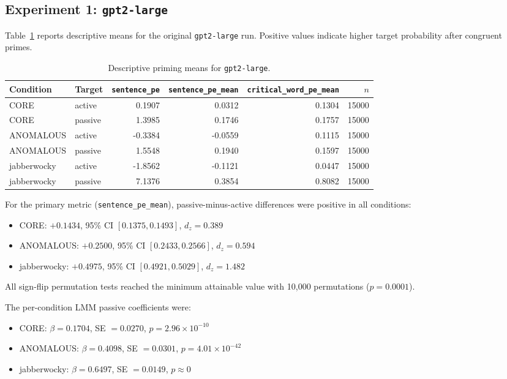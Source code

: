 \documentclass[11pt]{article}
\begin{document}
\subsection*{Experiment 1: \texttt{gpt2-large}}

Table~\ref{tab:gpt2desc} reports descriptive means for the original
\texttt{gpt2-large} run. Positive values indicate higher target probability
after congruent primes.

\begin{table}[h]
\centering
\caption{Descriptive priming means for \texttt{gpt2-large}.}
\label{tab:gpt2desc}
\begin{tabular}{llrrrr}
\toprule
Condition & Target & \texttt{sentence\_pe} & \texttt{sentence\_pe\_mean} & \texttt{critical\_word\_pe\_mean} & \(n\) \\
\midrule
CORE & active & 0.1907 & 0.0312 & 0.1304 & 15000 \\
CORE & passive & 1.3985 & 0.1746 & 0.1757 & 15000 \\
ANOMALOUS & active & -0.3384 & -0.0559 & 0.1115 & 15000 \\
ANOMALOUS & passive & 1.5548 & 0.1940 & 0.1597 & 15000 \\
jabberwocky & active & -1.8562 & -0.1121 & 0.0447 & 15000 \\
jabberwocky & passive & 7.1376 & 0.3854 & 0.8082 & 15000 \\
\bottomrule
\end{tabular}
\end{table}

For the primary metric (\texttt{sentence\_pe\_mean}), passive-minus-active
differences were positive in all conditions:

\begin{itemize}[leftmargin=*]
    \item CORE: \(+0.1434\), 95\% CI \([0.1375, 0.1493]\), \(d_z=0.389\)
    \item ANOMALOUS: \(+0.2500\), 95\% CI \([0.2433, 0.2566]\), \(d_z=0.594\)
    \item jabberwocky: \(+0.4975\), 95\% CI \([0.4921, 0.5029]\), \(d_z=1.482\)
\end{itemize}

All sign-flip permutation tests reached the minimum attainable value with
10,000 permutations (\(p=0.0001\)).

The per-condition LMM passive coefficients were:

\begin{itemize}[leftmargin=*]
    \item CORE: \(\beta=0.1704\), SE \(=0.0270\), \(p=2.96\times10^{-10}\)
    \item ANOMALOUS: \(\beta=0.4098\), SE \(=0.0301\), \(p=4.01\times10^{-42}\)
    \item jabberwocky: \(\beta=0.6497\), SE \(=0.0149\), \(p\approx 0\)
\end{itemize}
\end{document}
